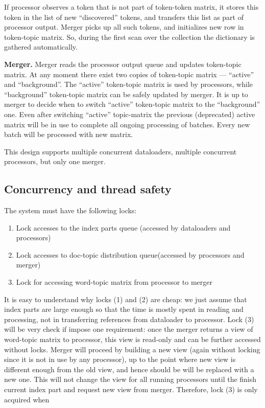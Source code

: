 \documentclass[11pt,a4paper,twoside]{report}
\begin{document}
If processor observes a token that is not part of token-token matrix, it stores this token in the list of
new ``discovered'' tokens, and transfers this list as part of processor output.
Merger picks up all such tokens, and initializes new row in token-topic matrix.
So, during the first scan over the collection the dictionary is gathered automatically.

\textbf{Merger.}
Merger reads the processor output queue and updates token-topic matrix.
At any moment there exist two copies of token-topic matrix ---
``active'' and ``background''.
The ``active'' token-topic matrix is used by processors,
while ``background'' token-topic matrix can be safely updated by merger.
It is up to merger to decide when to switch ``active'' token-topic matrix to the ``background'' one.
Even after switching ``active'' topic-matrix the previous (deprecated) active matrix
will be in use to complete all ongoing processing of batches.
Every new batch will be processed with new matrix.

This design supports multiple concurrent dataloaders, multiple concurrent processors, but only one merger.

\subsection{Concurrency and thread safety}
The system must have the following locks:
\begin{enumerate}
    \item Lock accesses to the index parts queue (accessed by dataloaders and processors)
    \item Lock accesses to doc-topic distribution queue(accessed by processors and merger)
    \item Lock for accessing word-topic matrix from processor to merger
\end{enumerate}

It is easy to understand why locks (1) and (2) are cheap:
we just assume that index parts are large enough so that the time is mostly spent in reading and processing,
not in transferring references from dataloader to processor.
Lock (3) will be very check if impose one requirement:
once the merger returns a view of word-topic matrix to processor,
this view is read-only and can be further accessed without locks.
Merger will proceed by building a new view (again without locking since it is not in use by any processor),
up to the point where new view is different enough from the old view,
and hence should be will be replaced with a new one.
This will not change the view for all running processors
until the finish current index part and request new view from merger.
Therefore, lock (3) is only acquired when
\end{document}

